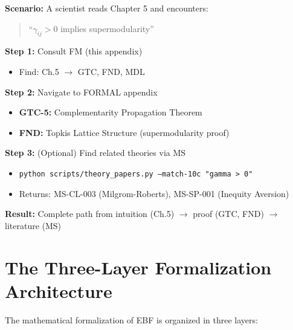 \begin{tcolorbox}[colback=green!5!white, colframe=green!75!black,
    title=\textbf{Example Workflow: From Chapter to Proof}]

\textbf{Scenario:} A scientist reads Chapter 5 and encounters:
\begin{quote}
``$\gamma_{ij} > 0$ implies supermodularity''
\end{quote}

\textbf{Step 1:} Consult FM (this appendix)
\begin{itemize}[nosep]
    \item Find: Ch.5 $\rightarrow$ GTC, FND, MDL
\end{itemize}

\textbf{Step 2:} Navigate to FORMAL appendix
\begin{itemize}[nosep]
    \item \textbf{GTC-5:} Complementarity Propagation Theorem
    \item \textbf{FND:} Topkis Lattice Structure (supermodularity proof)
\end{itemize}

\textbf{Step 3:} (Optional) Find related theories via MS
\begin{itemize}[nosep]
    \item \texttt{python scripts/theory\_papers.py --match-10c "gamma > 0"}
    \item Returns: MS-CL-003 (Milgrom-Roberts), MS-SP-001 (Inequity Aversion)
\end{itemize}

\textbf{Result:} Complete path from intuition (Ch.5) $\rightarrow$ proof (GTC, FND) $\rightarrow$ literature (MS)

\end{tcolorbox}

\section{The Three-Layer Formalization Architecture}
\label{sec:fm-architecture}

The mathematical formalization of EBF is organized in three layers:

